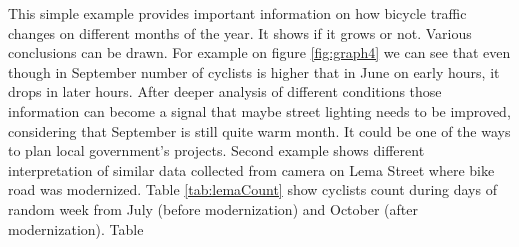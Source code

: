 This simple example provides important information on how bicycle traffic changes on different months of the year. It shows if it grows or not. Various conclusions can be drawn. For example on figure \ref{fig:graph4} we can see that even though in September number of cyclists is higher that in June on early hours, it drops in later hours. After deeper analysis of different conditions those information can become a signal that maybe street lighting needs to be improved, considering that September is still quite warm month. It could be one of the ways to plan local government's projects. Second example shows different interpretation of similar data collected from camera on Lema Street where bike road was modernized. Table \ref{tab:lemaCount} show cyclists count during days of random week from July (before modernization) and October (after modernization). Table 
\begin{table}[h]
    \centering
    \caption{Cyclist count during the day - week from July to week from October comparison (bike road on Lema Street)}
    \label{tab:lemaCount}
\end{table}

